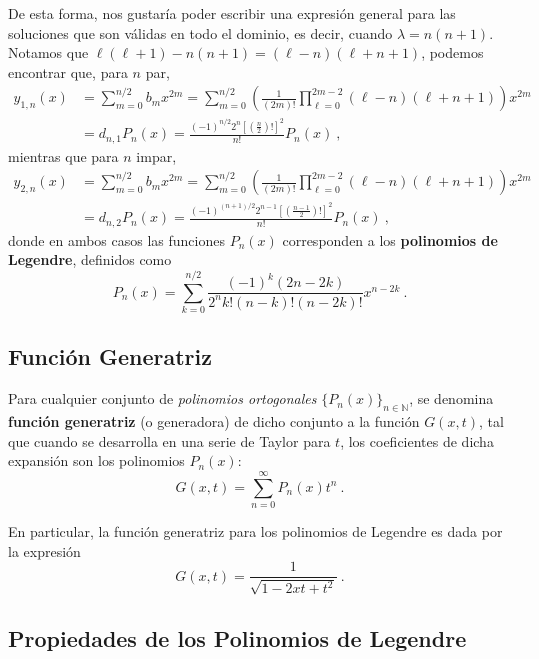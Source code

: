 De esta forma, nos gustaría poder escribir una expresión general para las soluciones que son válidas en todo el dominio, es decir, cuando $\lambda = n(n+1)$. Notamos que $\ell(\ell+1)-n(n+1) = (\ell - n)(\ell + n + 1)$, podemos encontrar que, para $n$ par,
\begin{align}
    y_{1,n}(x) & = \sum_{m=0}^{n/2} b_m x^{2m} = \sum_{m=0}^{n/2} \left(\frac{1}{(2m)!} \prod_{\ell=0}^{2m-2} (\ell-n)(\ell+n+1) \right) x^{2m} \\
    & = d_{n,1} P_n(x) = \frac{(-1)^{n/2} 2^n \left[ \left(\frac{n}{2}\right)! \right]^2}{n!}P_n(x) \ ,
\end{align}
mientras que para $n$ impar,
\begin{align}
    y_{2,n}(x) & = \sum_{m=0}^{n/2} b_m x^{2m} = \sum_{m=0}^{n/2} \left(\frac{1}{(2m)!} \prod_{\ell=0}^{2m-2} (\ell-n)(\ell+n+1) \right) x^{2m} \\
    & = d_{n,2} P_n(x) = \frac{(-1)^{(n+1)/2} 2^{n-1} \left[ \left(\frac{n-1}{2}\right)! \right]^2}{n!}P_n(x) \ ,
\end{align}
donde en ambos casos las funciones $P_n(x)$ corresponden a los \textbf{polinomios de Legendre}, definidos como
\begin{equation}
    P_n(x) = \sum_{k=0}^{n/2} \frac{(-1)^k (2n-2k)}{2^n k! (n-k)! (n-2k)!}x^{n-2k} \ .
\end{equation}

\subsection{Función Generatriz}

Para cualquier conjunto de \emph{polinomios ortogonales} $\{P_n(x)\}_{n\in \mathbb{N}}$, se denomina \textbf{función generatriz} (o generadora) de dicho conjunto a la función $G(x,t)$, tal que cuando se desarrolla en una serie de Taylor para $t$, los coeficientes de dicha expansión son los polinomios $P_n(x)$:
\begin{equation}
    G(x,t) = \sum_{n=0}^{\infty} P_n(x)t^n \ .
\end{equation}

En particular, la función generatriz para los polinomios de Legendre es dada por la expresión
\begin{equation}
    G(x,t) = \frac{1}{\sqrt{1-2xt + t^2}} \ .
\end{equation}

\subsection{Propiedades de los Polinomios de Legendre}


